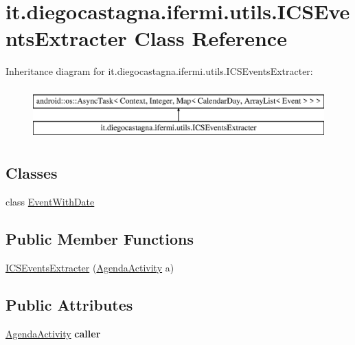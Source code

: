 \hypertarget{classit_1_1diegocastagna_1_1ifermi_1_1utils_1_1_i_c_s_events_extracter}{}\section{it.\+diegocastagna.\+ifermi.\+utils.\+I\+C\+S\+Events\+Extracter Class Reference}
\label{classit_1_1diegocastagna_1_1ifermi_1_1utils_1_1_i_c_s_events_extracter}
Inheritance diagram for it.\+diegocastagna.\+ifermi.\+utils.\+I\+C\+S\+Events\+Extracter\+:\begin{figure}[H]
\begin{center}
\leavevmode
\includegraphics[height=2.000000cm]{classit_1_1diegocastagna_1_1ifermi_1_1utils_1_1_i_c_s_events_extracter}
\end{center}
\end{figure}
\subsection*{Classes}
\begin{DoxyCompactItemize}
\item 
class \mbox{\hyperlink{classit_1_1diegocastagna_1_1ifermi_1_1utils_1_1_i_c_s_events_extracter_1_1_event_with_date}{Event\+With\+Date}}
\end{DoxyCompactItemize}
\subsection*{Public Member Functions}
\begin{DoxyCompactItemize}
\item 
\mbox{\hyperlink{classit_1_1diegocastagna_1_1ifermi_1_1utils_1_1_i_c_s_events_extracter_aa8cb19881d89d1a49c77d96f828e0a72}{I\+C\+S\+Events\+Extracter}} (\mbox{\hyperlink{classit_1_1diegocastagna_1_1ifermi_1_1activity_1_1_agenda_activity}{Agenda\+Activity}} a)
\end{DoxyCompactItemize}
\subsection*{Public Attributes}
\begin{DoxyCompactItemize}
\item 
\mbox{\label{classit_1_1diegocastagna_1_1ifermi_1_1utils_1_1_i_c_s_events_extracter_a4bfd1ca0d3c288db7aacf1a357303520}} 
\mbox{\hyperlink{classit_1_1diegocastagna_1_1ifermi_1_1activity_1_1_agenda_activity}{Agenda\+Activity}} {\bfseries caller}
\end{DoxyCompactItemize}
